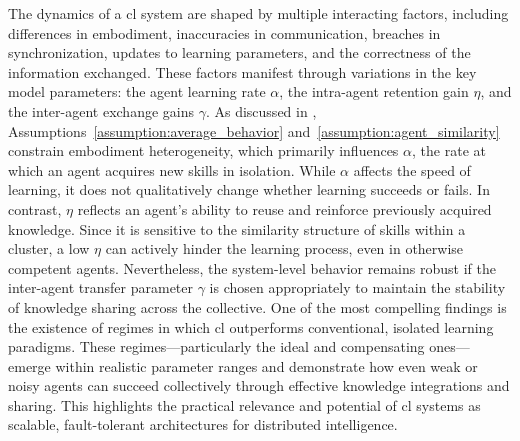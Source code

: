 \documentclass[12pt]{article}
\begin{document}
The dynamics of a \ac{cl} system are shaped by multiple interacting factors, including differences in embodiment, inaccuracies in communication, breaches in synchronization, updates to learning parameters, and the correctness of the information exchanged. These factors manifest through variations in the key model parameters: the agent learning rate $\alpha$, the intra-agent retention gain $\eta$, and the inter-agent exchange gains ${\gamma}$. As discussed in , Assumptions~\ref{assumption:average_behavior} and~\ref{assumption:agent_similarity} constrain embodiment heterogeneity, which primarily influences $\alpha$, the rate at which an agent acquires new skills in isolation. While $\alpha$ affects the speed of learning, it does not qualitatively change whether learning succeeds or fails. In contrast, $\eta$ reflects an agent’s ability to reuse and reinforce previously acquired knowledge. Since it is sensitive to the similarity structure of skills within a cluster, a low $\eta$ can actively hinder the learning process, even in otherwise competent agents. Nevertheless, the system-level behavior remains robust if the inter-agent transfer parameter $\gamma$ is chosen appropriately to maintain the stability of knowledge sharing across the collective. One of the most compelling findings is the existence of regimes in which \ac{cl} outperforms conventional, isolated learning paradigms. These regimes---particularly the ideal and compensating ones---emerge within realistic parameter ranges and demonstrate how even weak or noisy agents can succeed collectively through effective knowledge integrations and sharing. This highlights the practical relevance and potential of \ac{cl} systems as scalable, fault-tolerant architectures for distributed intelligence.

\end{document}
